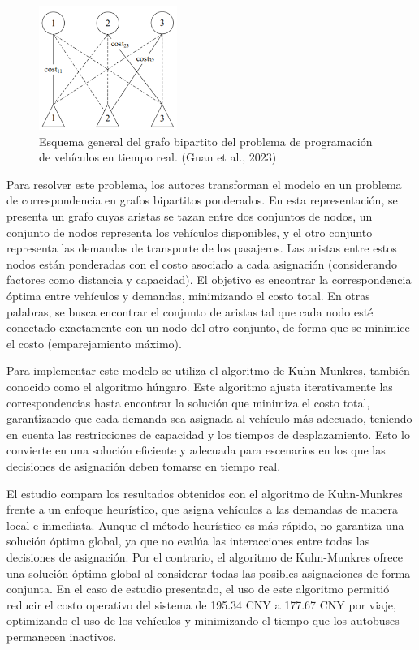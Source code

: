 \documentclass[preprint,11pt]{elsarticle}
\begin{document}
\captionsetup[figure]{name=Figura}
\begin{figure}[H]
  \centering
  \includegraphics[width=0.4\textwidth]{fig3.1.png}
  \caption{Esquema general del grafo bipartito del problema de programación de vehículos en tiempo real. (Guan et al., 2023)}
  \label{fig:mi_imagen}
\end{figure}

Para resolver este problema, los autores transforman el modelo en un problema de correspondencia en grafos bipartitos ponderados. En esta representación, se presenta un grafo cuyas aristas se tazan entre dos conjuntos de nodos, un conjunto de nodos representa los vehículos disponibles, y el otro conjunto representa las demandas de transporte de los pasajeros. Las aristas entre estos nodos están ponderadas con el costo asociado a cada asignación (considerando factores como distancia y capacidad). El objetivo es encontrar la correspondencia óptima entre vehículos y demandas, minimizando el costo total. En otras palabras, se busca encontrar el conjunto de aristas tal que cada nodo esté conectado exactamente con un nodo del otro conjunto, de forma que se minimice el costo (emparejamiento máximo).

Para implementar este modelo se utiliza el algoritmo de Kuhn-Munkres, también conocido como el algoritmo húngaro. Este algoritmo ajusta iterativamente las correspondencias hasta encontrar la solución que minimiza el costo total, garantizando que cada demanda sea asignada al vehículo más adecuado, teniendo en cuenta las restricciones de capacidad y los tiempos de desplazamiento. Esto lo convierte en una solución eficiente y adecuada para escenarios en los que las decisiones de asignación deben tomarse en tiempo real.

El estudio compara los resultados obtenidos con el algoritmo de Kuhn-Munkres frente a un enfoque heurístico, que asigna vehículos a las demandas de manera local e inmediata. Aunque el método heurístico es más rápido, no garantiza una solución óptima global, ya que no evalúa las interacciones entre todas las decisiones de asignación. Por el contrario, el algoritmo de Kuhn-Munkres ofrece una solución óptima global al considerar todas las posibles asignaciones de forma conjunta. En el caso de estudio presentado, el uso de este algoritmo permitió reducir el costo operativo del sistema de 195.34 CNY a 177.67 CNY por viaje, optimizando el uso de los vehículos y minimizando el tiempo que los autobuses permanecen inactivos.
\end{document}
